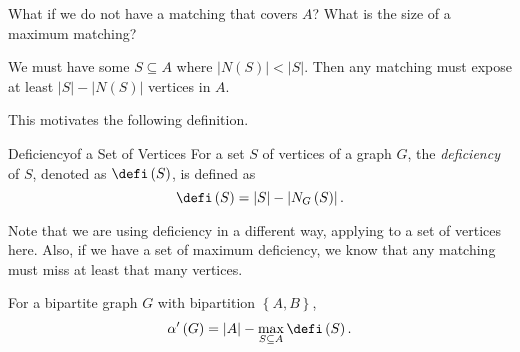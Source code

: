 \documentclass[co342]{subfiles}
\begin{document}
    \np What if we do not have a matching that covers $A$? What is the size of a maximum matching?

    \begin{subproof}[Idea]
        We must have some $S\subseteq A$ where $\left| N\left( S \right) \right|<\left| S \right|$. Then any matching must expose at least $\left| S \right|-\left| N\left( S \right) \right|$ vertices in $A$.
    \end{subproof}

    \noindent This motivates the following definition.

    \begin{definition}{Deficiency}{of a Set of Vertices}
        For a set $S$ of vertices of a graph $G$, the \emph{deficiency} of $S$, denoted as $\defi\left( S \right)$, is defined as
        \begin{equation*}
            \defi\left( S \right)=\left| S \right|-\left| N_G\left( S \right) \right|.
        \end{equation*}
    \end{definition}

    \noindent Note that we are using deficiency in a different way, applying to a set of vertices here. Also, if we have a set of maximum deficiency, we know that any matching must miss at least that many vertices.

    \clearpage
    \begin{cor}{}
        For a bipartite graph $G$ with bipartition $\left\lbrace A,B \right\rbrace$,
        \begin{equation*}
            \alpha'\left( G \right) = \left| A \right|-\max_{S\subseteq A}\defi\left( S \right).
        \end{equation*}
    \end{cor}	
\end{document}

